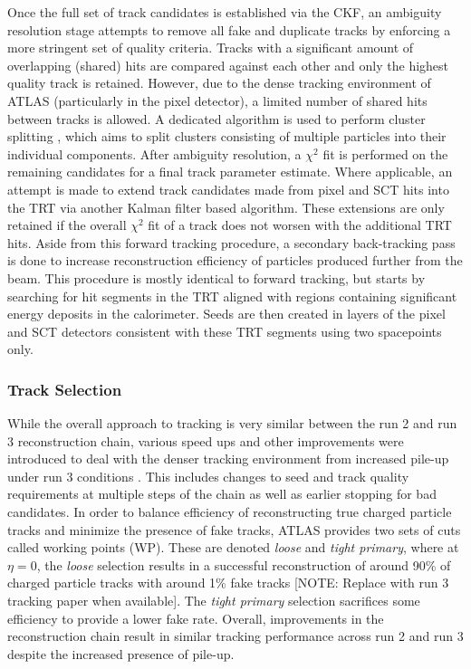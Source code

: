 Once the full set of track candidates is established via the CKF, an ambiguity resolution stage attempts to remove 
all fake and duplicate tracks by enforcing a more stringent set of quality criteria. Tracks with a significant 
amount of overlapping (shared) hits are compared against each other and only the highest quality track is retained. 
However, due to the dense tracking environment of ATLAS (particularly in the pixel detector), a limited number of 
shared hits between tracks is allowed. A dedicated algorithm is used to perform cluster splitting 
\cite{atlas-cluster-splitting}, which aims to split clusters consisting of multiple particles into their individual 
components. After ambiguity resolution, a $\chi^2$ fit is performed on the remaining candidates for a final track 
parameter estimate. Where applicable, an attempt is made to extend track candidates made from pixel and SCT hits 
into the TRT via another Kalman filter based algorithm. These extensions are only retained if the overall $\chi^2$ 
fit of a track does not worsen with the additional TRT hits. Aside from this forward tracking procedure, a 
secondary back-tracking pass is done to increase reconstruction efficiency of particles produced further from the 
beam. This procedure is mostly identical to forward tracking, but starts by searching for hit segments in the TRT 
aligned with regions containing significant energy deposits in the calorimeter. Seeds are then created in layers 
of the pixel and SCT detectors consistent with these TRT segments using two spacepoints only. \par 

\subsubsection*{Track Selection}

While the overall approach to tracking is very similar between the run 2 and run 3 reconstruction chain, various 
speed ups and other improvements were introduced to deal with the denser tracking environment from increased pile-up 
under run 3 conditions \cite{atlas-tracking-run3}. This includes changes to seed and track quality requirements at 
multiple steps of the chain as well as earlier stopping for bad candidates. In order to balance efficiency of 
reconstructing true charged particle tracks and minimize the presence of fake tracks, ATLAS provides two sets of 
cuts called working points (WP). These are denoted \textit{loose} and \textit{tight primary}, where at $\eta = 0$, 
the \textit{loose} selection results in a successful reconstruction of around 90\% of charged particle tracks with 
around 1\% fake tracks \cite{atlas-tracking-run2, atlas-tracking-run3} [NOTE: Replace with run 3 tracking paper when
available]. The \textit{tight primary} selection sacrifices some efficiency to provide a lower fake rate. Overall, 
improvements in the reconstruction chain result in similar tracking performance across run 2 and run 3 despite the 
increased presence of pile-up. \par

